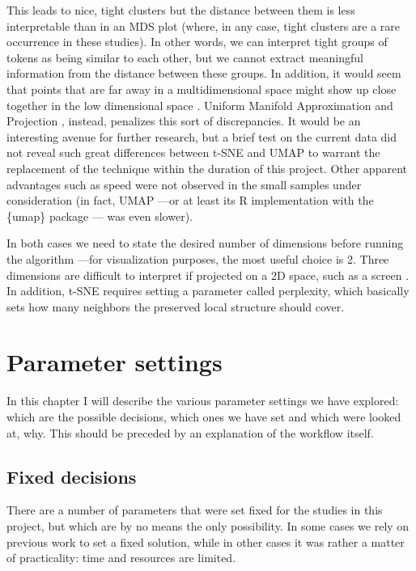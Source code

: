 \documentclass[
]{book}
\begin{document}
This leads to nice, tight clusters but the distance between them is less interpretable than in an MDS plot (where, in any case, tight clusters are a rare occurrence in these studies). In other words, we can interpret tight groups of tokens as being similar to each other, but we cannot extract meaningful information from the distance between these groups. In addition, it would seem that points that are far away in a multidimensional space might show up close together in the low dimensional space \autocite{oskolkov_2021}. Uniform Manifold Approximation and Projection \autocite{mcinnes.etal_2020}, instead, penalizes this sort of discrepancies. It would be an interesting avenue for further research, but a brief test on the current data did not reveal such great differences between t-SNE and UMAP to warrant the replacement of the technique within the duration of this project. Other apparent advantages such as speed were not observed in the small samples under consideration (in fact, UMAP ---or at least its R implementation with the \{umap\} package \autocite{R-umap}--- was even slower).

In both cases we need to state the desired number of dimensions before running the algorithm ---for visualization purposes, the most useful choice is 2. Three dimensions are difficult to interpret if projected on a 2D space, such as a screen \autocites[ 18]{card.etal_1999}[ 222]{wielfaert.etal_2019}. In addition, t-SNE requires setting a parameter called perplexity, which basically sets how many neighbors the preserved local structure should cover.

\hypertarget{params}{%
\chapter{Parameter settings}\label{params}}

In this chapter I will describe the various parameter settings we have explored:
which are the possible decisions, which ones we have set and which were looked at,
why. This should be preceded by an explanation of the workflow itself.

\hypertarget{fixed-decisions}{%
\section{Fixed decisions}\label{fixed-decisions}}

There are a number of parameters that were set fixed for the studies in this project, but which are by no means the only possibility. In some cases we rely on previous work to set a fixed solution, while in other cases it was rather a matter of practicality: time and resources are limited.
\end{document}
